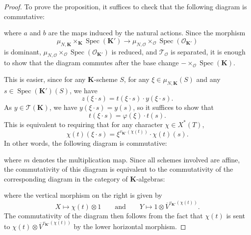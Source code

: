 \documentclass{proc-l}
\newcommand{\K}{\mathbf{K}}
\newcommand{\G}{\mathbf{G}}
\DeclareMathOperator{\Spec}{Spec}
\newcommand{\stackT}{\mathcal{T}}
\newcommand{\sheafO}{\mathcal{O}}
\theoremstyle{definition}
\theoremstyle{remark}
\numberwithin{equation}{section}
\begin{document}
\begin{proof}
    
To prove the proposition, it suffices to check that the following diagram is
commutative:
\begin{center}
\end{center}
where $a$ and $b$ are the maps induced by the natural actions. Since the morphism
\[
\mu_{N,\K} \times_{\K} \Spec(\K')
\longrightarrow
\mu_{N,\sheafO} \times_{\sheafO} \Spec(\sheafO_{\K'})
\]
is dominant, $\mu_{N,\sheafO} \times_{\sheafO} \Spec(\sheafO_{\K'})$ is reduced, and
$\stackT_{\sheafO}$ is separated, it is enough to show that the diagram commutes after
the base change $- \times_{\sheafO} \Spec(\K)$.


This is easier, since for any $\K$-scheme $S$, for any $\xi \in \mu_{N,\K}(S)$ and any
$s \in \Spec(\K')(S)$, we have
\[
z(\xi \cdot s) = t(\xi \cdot s) \cdot y(\xi \cdot s).
\]
As $y \in \stackT(\K)$, we have $y(\xi \cdot s) = y(s)$, so it suffices to show that
\[
t(\xi \cdot s) = \varphi(\xi) \cdot t(s).
\]
This is equivalent to requiring that for any character $\chi \in X^{*}(T)$,
\[
\chi(t)(\xi \cdot s) = \xi^{v_{\K'}(\chi(t))} \cdot \chi(t)(s).
\]
In other words, the following diagram is commutative:
\begin{center}
\end{center}
where $m$ denotes the multiplication map. Since all schemes involved are affine, the
commutativity of this diagram is equivalent to the commutativity of the corresponding
diagram in the category of $\K$-algebras:
\begin{center}
\end{center}
where the vertical morphism on the right is given by
\[
X \longmapsto \chi(t) \otimes 1
\qquad\text{and}\qquad
Y \longmapsto 1 \otimes \overline{V}^{v_{\K'}(\chi(t))}.
\]
The commutativity of the diagram then follows from the fact that $\chi(t)$ is sent to
$\chi(t) \otimes \overline{V}^{v_{\K'}(\chi(t))}$ by the lower horizontal morphism.




\end{proof}
\end{document}
